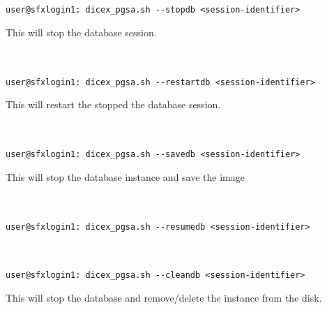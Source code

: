 \documentclass[10,twocolumn]{article}
\begin{document}
\paragraph{}\hfill\\
\begin{lstlisting}[style=mystyle]
user@sfxlogin1: dicex_pgsa.sh --stopdb <session-identifier>
\end{lstlisting}
This will stop the database session.

\paragraph{}\hfill\\
\begin{lstlisting}[style=mystyle]
user@sfxlogin1: dicex_pgsa.sh --restartdb <session-identifier>
\end{lstlisting}
This will restart the stopped the database session.

\paragraph{}\hfill\\
\begin{lstlisting}[style=mystyle]
user@sfxlogin1: dicex_pgsa.sh --savedb <session-identifier>
\end{lstlisting}
This will stop the database instance and save the image 

\paragraph{}\hfill\\
\begin{lstlisting}[style=mystyle]
user@sfxlogin1: dicex_pgsa.sh --resumedb <session-identifier>
\end{lstlisting}

\paragraph{}\hfill\\
\begin{lstlisting}[style=mystyle]
user@sfxlogin1: dicex_pgsa.sh --cleandb <session-identifier>
\end{lstlisting}
This will stop the database and remove/delete the instance from the disk. 
\end{document}
